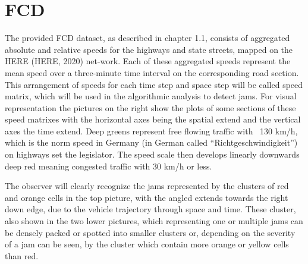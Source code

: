\documentclass[a4paper,12pt]{report}
\begin{document}
\section{FCD}
\par The provided FCD dataset, as described in chapter 1.1, consists of aggregated absolute and relative speeds for the highways and state streets, mapped on the HERE (HERE, 2020) net-work. Each of these aggregated speeds represent the mean speed over a three-minute time interval on the corresponding road section. This arrangement of speeds for each time step and space step will be called speed matrix, which will be used in the algorithmic analysis to detect jams. For visual representation the pictures on the right show the plots of some sections of these speed matrixes with the horizontal axes being the spatial extend and the vertical axes the time extend. Deep greens represent free flowing traffic with ~130 km/h, which is the norm speed in Germany (in German called “Richtgeschwindigkeit”) on highways set the legislator. The speed scale then develops linearly downwards deep red meaning congested traffic with 30 km/h or less. 
\par The observer will clearly recognize the jams represented by the clusters of red and orange cells in the top picture, with the angled extends towards the right down edge, due to the vehicle trajectory through space and time. These cluster, also shown in the two lower pictures, which representing one or multiple jams can be densely packed or spotted into smaller clusters or, depending on the severity of a jam can be seen, by the cluster which contain more orange or yellow cells than red. 
\end{document}
